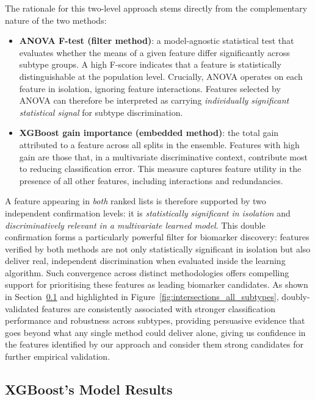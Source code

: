 The rationale for this two-level approach stems directly from the complementary nature
of the two methods:

\begin{itemize}
    \item \textbf{ANOVA F-test (filter method)}: a model-agnostic statistical test that
    evaluates whether the means of a given feature differ significantly across subtype groups.
    A high F-score indicates that a feature is statistically distinguishable at the population
    level. Crucially, ANOVA operates on each feature in isolation, ignoring feature interactions.
    Features selected by ANOVA can therefore be interpreted as carrying \textit{individually
    significant statistical signal} for subtype discrimination.

    \item \textbf{XGBoost gain importance (embedded method)}: the total gain attributed to a
    feature across all splits in the ensemble. Features with high gain are those that, in a
    multivariate discriminative context, contribute most to reducing classification error. This
    measure captures feature utility in the presence of all other features, including interactions and redundancies.
\end{itemize}

A feature appearing in \textit{both} ranked lists is therefore supported by two independent
confirmation levels: it is \textit{statistically significant in isolation} and
\textit{discriminatively relevant in a multivariate learned model}. This double 
confirmation forms a particularly powerful filter for biomarker discovery: features 
verified by both methods are not only statistically significant in isolation but also 
deliver real, independent discrimination when evaluated inside the learning algorithm. 
Such convergence across distinct methodologies offers compelling support for prioritising 
these features as leading biomarker candidates. As shown in 
Section~\ref{sec:model-results} and highlighted in Figure~\ref{fig:intersections_all_subtypes}, 
doubly-validated features are consistently associated with stronger classification 
performance and robustness across subtypes, providing persuasive evidence that goes 
beyond what any single method could deliver alone, giving us confidence in the 
features identified by our approach and consider them strong candidates for 
further empirical validation. 

\subsection{XGBoost's Model Results}
\label{sec:model-results}

